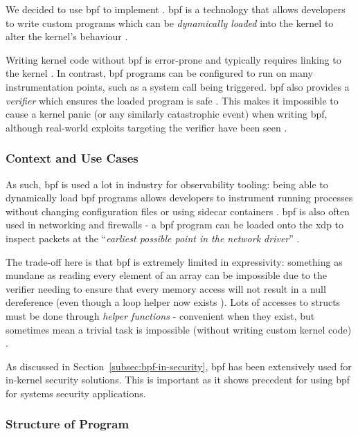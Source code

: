 We decided to use \ac{bpf} to implement \af. \ac{bpf} is a technology
that allows developers to write custom programs which can be \textit{dynamically
loaded} into the kernel to alter the kernel's behaviour \cite{LEARNING_EBPF}.

Writing kernel code without \ac{bpf} is error-prone and typically
requires linking to the kernel \cite{UNDERSTANDING_LINUX_KERNEL}. In contrast,
\ac{bpf} programs can be configured to run on many instrumentation points, such
as a system call being triggered. \ac{bpf} also provides a \textit{verifier} which
ensures the  loaded program is safe \cite{LEARNING_EBPF}. This makes it
impossible to cause a kernel panic (or any similarly catastrophic event) when
writing \ac{bpf}, although real-world exploits targeting the verifier have
been seen \cite{BPF_VERIFIER_EXPLOIT}.  

\subsubsection{Context and Use Cases}

As such, \ac{bpf} is used a lot in industry for observability tooling: being able to
dynamically load \ac{bpf} programs allows developers to instrument running processes
without changing configuration files or using sidecar containers \cite{SIDECAR}.
\ac{bpf} is also often used in networking and firewalls 
\cite{LINUX_NETWORKING_OBSERVABILITY} - a \ac{bpf} program can be loaded 
onto the \ac{xdp} to inspect packets at the 
``\textit{earliest possible point in the network driver}'' 
\cite{CILIUM_BPF_XDP_INTRO}. 

The trade-off here is that \ac{bpf} is extremely limited in expressivity:
something as mundane as reading every element of an array can be impossible due
to the verifier needing to ensure that every memory access will not result in 
a null dereference (even though a loop helper now exists 
\cite{BPF_LOOP_COMMIT}). Lots of accesses to structs must be done through 
\textit{helper functions} - convenient when they exist, but sometimes mean a trivial
task is impossible (without writing custom kernel code) \cite{bpf_kfuncs_docs}. 

As discussed in Section~\ref{subsec:bpf-in-security}, \ac{bpf} has been
extensively used for in-kernel security solutions. This is important as it shows
precedent for using \ac{bpf} for systems security applications.

\subsubsection{Structure of  Program}

